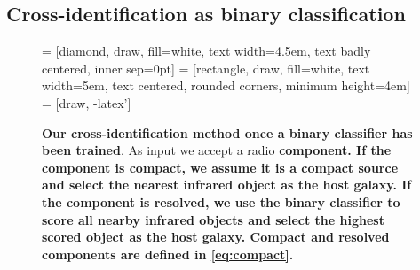 \documentclass[fleqn,usenatbib,usedcolumn]{mnras}
\newcommand{\edited}[1]{{\bf {#1}}}
\begin{document}
  \subsection{Cross-identification as binary classification}\label{sec:xid-as-binary-classification}
    \begin{figure}
      \centering
       = [diamond, draw, fill=white,
          text width=4.5em, text badly centered, inner sep=0pt]
       = [rectangle, draw, fill=white,
          text width=5em, text centered, rounded corners, minimum height=4em]
       = [draw, -latex']
      \caption{\edited{Our cross-identification method once a binary classifier has been trained}. As
        input we accept a radio \edited{component. If the component is compact, we assume it is a compact source and select
        the nearest infrared object as the host galaxy. If the component is
        resolved, we use the binary classifier to score all nearby infrared objects
        and select the highest scored object as the host galaxy. Compact and resolved components are defined in \autoref{eq:compact}.}}
      \label{fig:flowchart}
    \end{figure}
\end{document}
